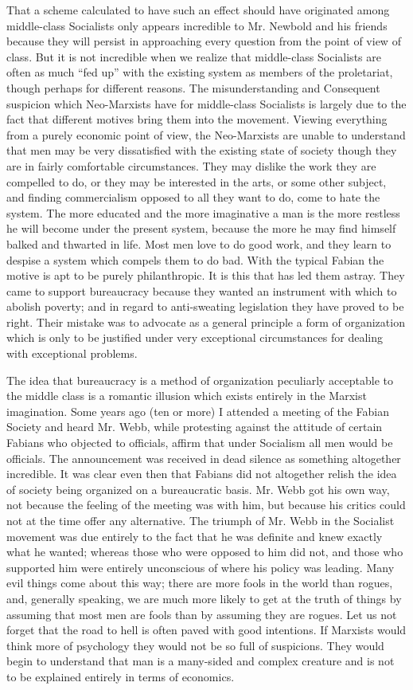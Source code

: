 \documentclass{book}
\begin{document}
That a scheme calculated to have such an effect should have originated among middle-class Socialists only appears incredible to Mr. Newbold and his friends because they will persist in approaching every question from the point of view of class. But it is not incredible when we realize that middle-class Socialists are often as much “fed up” with the existing system as members of the proletariat, though perhaps for different reasons. The misunderstanding and Consequent suspicion which Neo-Marxists have for middle-class Socialists is largely due to the fact that different motives bring them into the movement. Viewing everything from a purely economic point of view, the Neo-Marxists are unable to understand that men may be very dissatisfied with the existing state of society though they are in fairly comfortable circumstances. They may dislike the work they are compelled to do, or they may be interested in the arts, or some other subject, and finding commercialism opposed to all they want to do, come to hate the system. The more educated and the more imaginative a man is the more restless he will become under the present system, because the more he may find himself balked and thwarted in life. Most men love to do good work, and they learn to despise a system which compels them to do bad. With the typical Fabian the motive is apt to be purely philanthropic. It is this that has led them astray. They came to support bureaucracy because they wanted an instrument with which to abolish poverty; and in regard to anti-sweating legislation they have proved to be right. Their mistake was to advocate as a general principle a form of organization which is only to be justified under very exceptional circumstances for dealing with exceptional problems.

The idea that bureaucracy is a method of organization peculiarly acceptable to the middle class is a romantic illusion which exists entirely in the Marxist imagination. Some years ago (ten or more) I attended a meeting of the Fabian Society and heard Mr. Webb, while protesting against the attitude of certain Fabians who objected to officials, affirm that under Socialism all men would be officials. The announcement was received in dead silence as something altogether incredible. It was clear even then that Fabians did not altogether relish the idea of society being organized on a bureaucratic basis. Mr. Webb got his own way, not because the feeling of the meeting was with him, but because his critics could not at the time offer any alternative. The triumph of Mr. Webb in the Socialist movement was due entirely to the fact that he was definite and knew exactly what he wanted; whereas those who were opposed to him did not, and those who supported him were entirely unconscious of where his policy was leading. Many evil things come about this way; there are more fools in the world than rogues, and, generally speaking, we are much more likely to get at the truth of things by assuming that most men are fools than by assuming they are rogues. Let us not forget that the road to hell is often paved with good intentions. If Marxists would think more of psychology they would not be so full of suspicions. They would begin to understand that man is a many-sided and complex creature and is not to be explained entirely in terms of economics.
\end{document}
